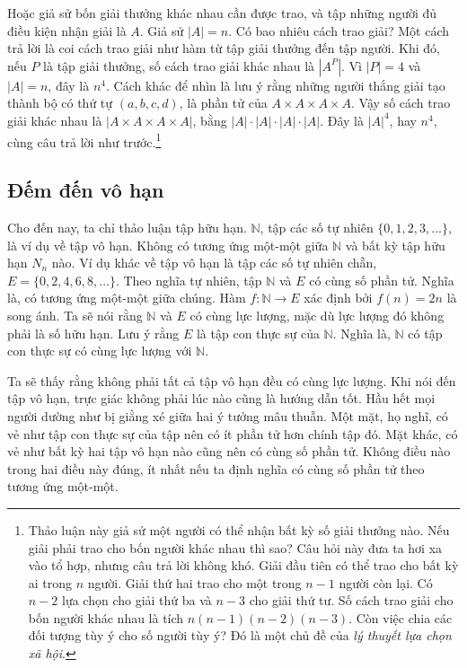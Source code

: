 Hoặc giả sử bốn giải thưởng khác nhau cần được trao, và tập những người đủ điều kiện nhận giải là $A$. Giả sử $|A| = n$. Có bao nhiêu cách trao giải? Một cách trả lời là coi cách trao giải như hàm từ tập giải thưởng đến tập người. Khi đó, nếu $P$ là tập giải thưởng, số cách trao giải khác nhau là $|A^P|$. Vì $|P| = 4$ và $|A| = n$, đây là $n^4$. Cách khác để nhìn là lưu ý rằng những người thắng giải tạo thành bộ có thứ tự $(a,b,c,d)$, là phần tử của $A \times A \times A \times A$. Vậy số cách trao giải khác nhau là $|A \times A \times A \times A|$, bằng $|A| \cdot |A| \cdot |A| \cdot |A|$. Đây là $|A|^4$, hay $n^4$, cùng câu trả lời như trước.\footnote{Thảo luận này giả sử một người có thể nhận bất kỳ số giải thưởng nào. Nếu giải phải trao cho bốn người khác nhau thì sao? Câu hỏi này đưa ta hơi xa vào tổ hợp, nhưng câu trả lời không khó. Giải đầu tiên có thể trao cho bất kỳ ai trong $n$ người. Giải thứ hai trao cho một trong $n-1$ người còn lại. Có $n-2$ lựa chọn cho giải thứ ba và $n-3$ cho giải thứ tư. Số cách trao giải cho bốn người khác nhau là tích $n(n-1)(n-2)(n-3)$. Còn việc chia các đối tượng tùy ý cho số người tùy ý? Đó là một chủ đề của \emph{lý thuyết lựa chọn xã hội}.}

\subsection{Đếm đến vô hạn}

Cho đến nay, ta chỉ thảo luận tập hữu hạn. $\mathbb{N}$, tập các số tự nhiên $\{0,1,2,3,\ldots\}$, là ví dụ về tập vô hạn. Không có tương ứng một-một giữa $\mathbb{N}$ và bất kỳ tập hữu hạn $N_n$ nào. Ví dụ khác về tập vô hạn là tập các số tự nhiên chẵn, $E = \{0,2,4,6,8,\ldots\}$. Theo nghĩa tự nhiên, tập $\mathbb{N}$ và $E$ có cùng số phần tử. Nghĩa là, có tương ứng một-một giữa chúng. Hàm $f\colon \mathbb{N} \to E$ xác định bởi $f(n) = 2n$ là song ánh. Ta sẽ nói rằng $\mathbb{N}$ và $E$ có cùng lực lượng, mặc dù lực lượng đó không phải là số hữu hạn. Lưu ý rằng $E$ là tập con thực sự của $\mathbb{N}$. Nghĩa là, $\mathbb{N}$ có tập con thực sự có cùng lực lượng với $\mathbb{N}$.

Ta sẽ thấy rằng không phải tất cả tập vô hạn đều có cùng lực lượng. Khi nói đến tập vô hạn, trực giác không phải lúc nào cũng là hướng dẫn tốt. Hầu hết mọi người dường như bị giằng xé giữa hai ý tưởng mâu thuẫn. Một mặt, họ nghĩ, có vẻ như tập con thực sự của tập nên có ít phần tử hơn chính tập đó. Mặt khác, có vẻ như bất kỳ hai tập vô hạn nào cũng nên có cùng số phần tử. Không điều nào trong hai điều này đúng, ít nhất nếu ta định nghĩa có cùng số phần tử theo tương ứng một-một.

